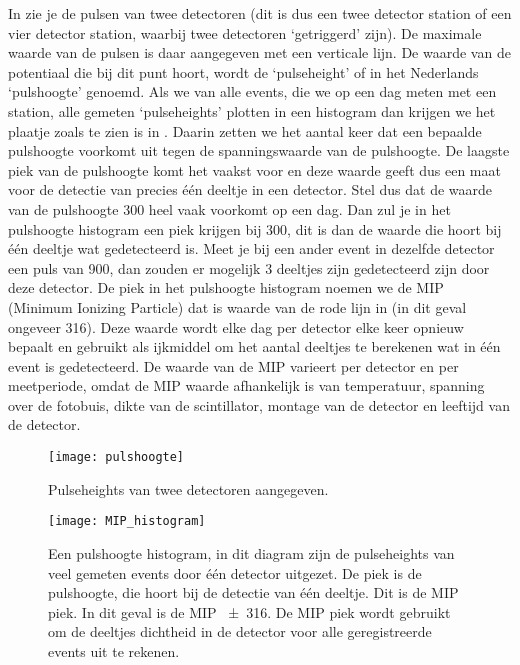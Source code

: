 In  zie je de pulsen van twee detectoren (dit is
dus een twee detector station of een vier detector station, waarbij twee
detectoren `getriggerd' zijn). De maximale waarde van de pulsen is daar
aangegeven met een verticale lijn. De waarde van de potentiaal die bij
dit punt hoort, wordt de `pulseheight' of in het Nederlands `pulshoogte'
genoemd. Als we van alle events, die we op een dag meten met een
station, alle gemeten `pulseheights' plotten in een histogram dan
krijgen we het plaatje zoals te zien is in . Daarin
zetten we het aantal keer dat een bepaalde pulshoogte voorkomt uit tegen
de spanningswaarde van de pulshoogte. De laagste piek van de pulshoogte
komt het vaakst voor en deze waarde geeft dus een maat voor de detectie van
precies één deeltje in een detector. Stel dus dat de waarde van de
pulshoogte \SI{300}{\adc} heel vaak voorkomt op een dag. Dan zul je in het
pulshoogte histogram een piek krijgen bij \SI{300}{\adc}, dit is dan de
waarde die hoort bij één
deeltje wat gedetecteerd is. Meet je bij een ander event in dezelfde detector
een puls van \SI{900}{\adc}, dan zouden er mogelijk 3 deeltjes zijn gedetecteerd
zijn door deze detector. De piek in het pulshoogte histogram noemen we
de MIP (Minimum Ionizing Particle) dat is waarde van de rode lijn in
 (in dit geval ongeveer \SI{316}{\adc}).
Deze waarde wordt elke dag per detector elke keer opnieuw bepaalt en gebruikt als ijkmiddel om
het aantal deeltjes te berekenen wat in één event is gedetecteerd. De waarde
van de MIP varieert per detector en per meetperiode, omdat de MIP waarde
afhankelijk is van temperatuur, spanning over de fotobuis, dikte van de
scintillator, montage van de detector en leeftijd van de detector.

\begin{figure}
    \centering
    \texttt{[image: pulshoogte]}
    \caption{Pulseheights van twee detectoren aangegeven.}
    \label{fig:pulshoogte}
\end{figure}

\begin{figure}
    \centering
    \texttt{[image: MIP\_histogram]}
    \caption{Een pulshoogte histogram, in dit diagram zijn de pulseheights van veel
    gemeten events door één detector uitgezet. De piek is de pulshoogte,
    die hoort bij de detectie van één deeltje. Dit is de MIP piek. In dit geval is
    de MIP \SI{\pm316}{\adc}. De MIP piek wordt gebruikt om de deeltjes
    dichtheid in de detector voor alle geregistreerde events uit te
    rekenen.}
    \label{fig:MIP_histogram}
\end{figure}

